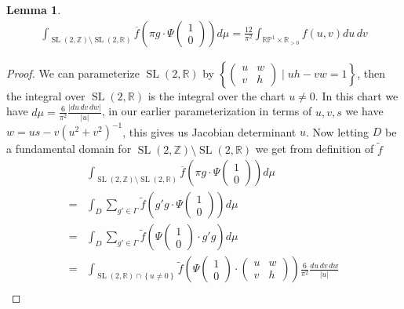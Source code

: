 \documentclass{article}
\newtheorem{lemma}{Lemma}
\newcommand{\set}[1]{\left\{#1\right\}}
\newcommand{\abs}[1]{\left\vert#1\right\vert}
\newcommand{\slr}{\operatorname{SL}(2,\mathbb{R})}
\newcommand{\slz}{\operatorname{SL}(2,\mathbb{Z})}
\begin{document}
        \begin{lemma}
            \begin{align*}
                \int_{\slz \setminus \slr} \overline{f}\left(\pi g \cdot \Psi \begin{pmatrix} 1 \\ 0 \end{pmatrix}\right)d\mu = \frac{12}{\pi^2}\int_{\mathbb{RP}^1 \times \mathbb{R}_{>0}} f(u,v)du\,dv
            \end{align*}
        \end{lemma}
        \begin{proof}
            We can parameterize \(\slr\) by \(\set{\begin{pmatrix} u & w \\ v & h \end{pmatrix} \mid  uh - vw = 1}\), then the integral over \(\slr\) is the integral over the chart \(u \neq 0\). In this chart we have \(d\mu = \frac{6}{\pi^2}\frac{\abs{du\,dv\,dw}}{\abs{u}}\), in our earlier parameterization in terms of \(u,v,s\) we have \(w = us - v(u^2 + v^2)^{-1}\), this gives us Jacobian determinant \(u\). Now letting \(D\) be a fundamental domain for \(\slz \setminus \slr\) we get from definition of \(\tilde{f}\)
            \begin{align*}
                &\int_{\slz \setminus \slr} \overline{f}\left(\pi g \cdot \Psi \begin{pmatrix} 1 \\ 0 \end{pmatrix}\right)d\mu \\
                = &\int_{D} \sum_{g' \in \Gamma}\tilde{f}\left(g'g \cdot \Psi \begin{pmatrix} 1 \\ 0 \end{pmatrix}\right)d\mu  \\
                = &\int_D \sum_{g' \in \Gamma}\tilde{f}\left(\Psi \begin{pmatrix} 1 \\ 0 \end{pmatrix} \cdot g'g \right)d\mu \\
                = &\int_{\slr \cap \set{u \neq 0}} \tilde{f}\left(\Psi \begin{pmatrix} 1 \\ 0 \end{pmatrix} \cdot \begin{pmatrix} u & w \\ v & h \end{pmatrix}\right)\frac{6}{\pi^2}\frac{du\,dv\,dw}{\abs{u}} \\

\end{align*}
\end{proof}
\end{document}
